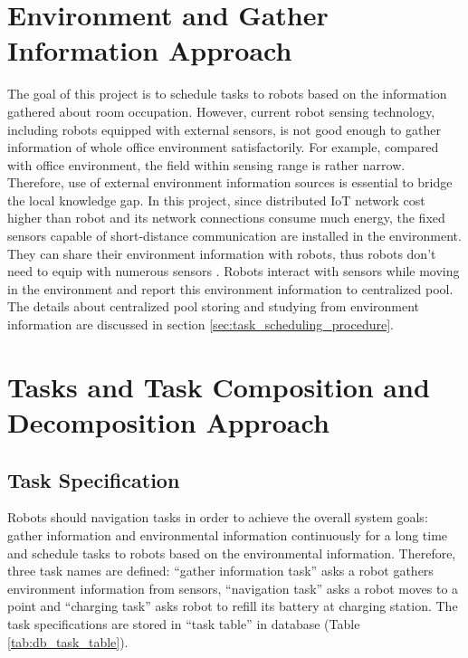 \section{Environment and Gather Information Approach}
\label{sec:environment_and_gather_information_approach}

The goal of this project is to schedule tasks to robots based on the information gathered about room occupation. However, current robot sensing technology, including robots equipped with external sensors, is not good enough to gather information of whole office environment satisfactorily. 
For example, compared with office environment, the field within sensing range is rather narrow. Therefore, use of external environment information sources is essential to bridge the local knowledge gap.
In this project, since distributed IoT network cost higher than robot and its network connections consume much energy, the fixed sensors capable of short-distance communication are installed in the environment. They can share their environment information with robots, thus robots don't need to equip with numerous sensors \cite{PYO2015148}.
Robots interact with sensors while moving in the environment and report this environment information to centralized pool.
The details about centralized pool storing and studying from environment information are discussed in section \ref{sec:task_scheduling_procedure}.



\section{Tasks and Task Composition and Decomposition Approach}
\label{sec:task_explan}

\subsection{Task Specification}
Robots should navigation tasks in order to achieve the overall system goals: gather information and environmental information continuously for a long time and schedule tasks to robots based on the environmental information. Therefore, three task names are defined: ``gather information task'' asks a robot gathers environment information from sensors, ``navigation task'' asks a robot moves to a point and  ``charging task'' asks robot to refill its battery at charging station.
The task specifications are stored in ``task table'' in database (Table \ref{tab:db_task_table}).

